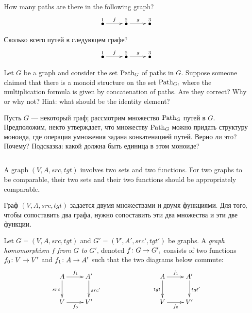 \documentclass[../main/CT4S-EN-RU]{subfiles}
\begin{document}
\begin{exerciseENG}
How many paths are there in the following graph?
$$\xymatrix{\LMO{1}\ar[r]^{f}&\LMO{2}\ar[r]^{g}&\LMO{3}}$$
\end{exerciseENG}

\begin{exerciseRUS}
Сколько всего путей в следующем графе?
$$\xymatrix{
    \LMO{1} \ar[r]^{f}  &  \LMO{2} \ar[r]^{g}  &  \LMO{3}
}$$
\end{exerciseRUS}

\begin{exerciseENG}
Let $G$ be a graph and consider the set $\operatorname{Path}_G$ of paths in $G.$ Suppose someone claimed that there is a monoid structure on the set $\operatorname{Path}_G,$ where the multiplication formula is given by concatenation of paths. Are they correct? Why or why not? Hint: what should be the identity element?
\end{exerciseENG}

\begin{exerciseRUS}
Пусть $G$ — некоторый граф; рассмотрим множество $\operatorname{Path}_G$ путей в $G.$ Предположим, некто утверждает, что множеству $\operatorname{Path}_G$ можно придать структуру моноида, где операция умножения задана конкатенацией путей. Верно ли это? Почему? Подсказка: какой должна быть единица в этом моноиде?
\end{exerciseRUS}


\subsection{}

\begin{blockENG}
A graph $(V,A,src,tgt)$ involves two sets and two functions. For two graphs to be comparable, their two sets and their two functions should be appropriately comparable.
\end{blockENG}

\begin{blockRUS}
Граф $(V,A,src,tgt)$ задается двумя множествами и двумя функциями. Для того, чтобы сопоставить два графа, нужно сопоставить эти два множества и эти две функции.
\end{blockRUS}

\begin{definitionENG}\label{def:graph homomorphism}
Let $G=(V,A,src,tgt)$ and $G'=(V',A',src',tgt')$ be graphs. A {\em graph homomorphism $f$ from $G$ to $G'$}, denoted $f\colon G\rightarrow G',$ consists of two functions $f_0\colon V\rightarrow V'$ and $f_1\colon A\rightarrow A'$ such that the two diagrams below commute:
\begin{align}\label{dia:graph hom}
\xymatrix{A\ar[r]^{f_1}\ar[d]_{src}&A'\ar[d]^{src'}\\V\ar[r]_{f_0}&V'
}\hspace{1in}
\xymatrix{A\ar[r]^{f_1}\ar[d]_{tgt}&A'\ar[d]^{tgt'}\\V\ar[r]_{f_0}&V'
}
\end{align}
\end{definitionENG}
\end{document}
